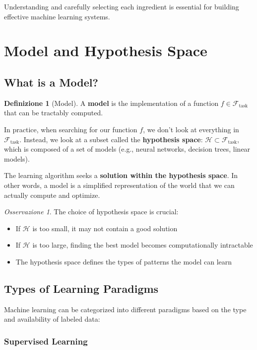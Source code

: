 \documentclass[11pt,a4paper]{article}
\theoremstyle{definition}
\newtheorem{definition}{Definizione}[section]
\theoremstyle{plain}
\theoremstyle{remark}
\newtheorem*{observation}{Osservazione}
\begin{document}
Understanding and carefully selecting each ingredient is essential for building effective machine learning systems.

\section{Model and Hypothesis Space}

\subsection{What is a Model?}

\begin{definition}[Model]
A \textbf{model} is the implementation of a function $f \in \mathcal{F}_{\text{task}}$ that can be tractably computed.
\end{definition}

In practice, when searching for our function $f$, we don't look at everything in $\mathcal{F}_{\text{task}}$. Instead, we look at a subset called the \textbf{hypothesis space}: $\mathcal{H} \subset \mathcal{F}_{\text{task}}$, which is composed of a set of models (e.g., neural networks, decision trees, linear models).

The learning algorithm seeks a \textbf{solution within the hypothesis space}. In other words, a model is a simplified representation of the world that we can actually compute and optimize.

\begin{observation}
The choice of hypothesis space is crucial:
\begin{itemize}
    \item If $\mathcal{H}$ is too small, it may not contain a good solution
    \item If $\mathcal{H}$ is too large, finding the best model becomes computationally intractable
    \item The hypothesis space defines the types of patterns the model can learn
\end{itemize}
\end{observation}

\subsection{Types of Learning Paradigms}

Machine learning can be categorized into different paradigms based on the type and availability of labeled data:

\subsubsection{Supervised Learning}
\end{document}
